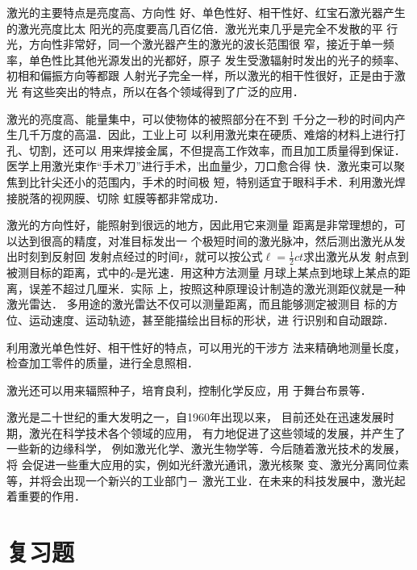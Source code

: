 激光的主要特点是亮度高、方向性
好、单色性好、相干性好、红宝石激光器产生的激光亮度比太
阳光的亮度要高几百亿倍．激光光束几乎是完全不发散的平
行光，方向性非常好，同一个激光器产生的激光的波长范围很
窄，接近于单一频率，单色性比其他光源发出的光都好，原子
发生受激辐射时发出的光子的频率、初相和偏振方向等都跟
人射光子完全一样，所以激光的相干性很好，正是由于激光
有这些突出的特点，所以在各个领域得到了广泛的应用．

激光的亮度高、能量集中，可以使物体的被照部分在不到
千分之一秒的时间内产生几千万度的高温．因此，工业上可
以利用激光束在硬质、难熔的材料上进行打孔、切割，还可以
用来焊接金属，不但提高工作效率，而且加工质量得到保证．
医学上用激光束作“手术刀”进行手术，出血量少，刀口愈合得
快．激光束可以聚焦到比针尖还小的范围内，手术的时间极
短，特别适宜于眼科手术．利用激光焊接脱落的视网膜、切除
虹膜等都非常成功．

激光的方向性好，能照射到很远的地方，因此用它来测量
距离是非常理想的，可以达到很高的精度，对准目标发出一
个极短时间的激光脉冲，然后测出激光从发出时刻到反射回
发射点经过的时间$t$，就可以按公式$\ell=\frac{1}{2}ct$求出激光从发
射点到被测目标的距离，式中的$c$是光速．用这种方法测量
月球上某点到地球上某点的距离，误差不超过几厘米．实际
上，按照这种原理设计制造的激光测距仪就是一种激光雷达．
多用途的激光雷达不仅可以测量距离，而且能够测定被测目
标的方位、运动速度、运动轨迹，甚至能描绘出目标的形状，进
行识别和自动跟踪．

利用激光单色性好、相干性好的特点，可以用光的干涉方
法来精确地测量长度，检查加工零件的质量，进行全息照相．

激光还可以用来辐照种子，培育良利，控制化学反应，用
于舞台布景等．

激光是二十世纪的重大发明之一，自1960年出现以来，
目前还处在迅速发展时期，激光在科学技术各个领域的应用，
有力地促进了这些领域的发展，并产生了一些新的边缘科学，
例如激光化学、激光生物学等．今后随着激光技术的发展，将
会促进一些重大应用的实，例如光纤激光通讯，激光核聚
变、激光分离同位素等，并将会出现一个新兴的工业部门－
激光工业．在未来的科技发展中，激光起着重要的作用．

\section*{复习题}

